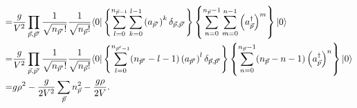 \documentclass{assignment}
\begin{document}
\begin{pf}
\begin{itemize}
{\begin{align}
            \notag=&\frac{g}{V^2}\prod_{\vec{p},\vec{p}'}\frac{1}{\sqrt{n_{\vec{p}'}!}}\frac{1}{\sqrt{n_{\vec{p}}!}}\langle 0\rvert\left\{\sum_{l=0}^{n_{\vec{p}-1}}\sum_{k=0}^{l-1}\left(a_{\vec{p}'}\right)^k\delta_{\vec{p},\vec{p}'}\right\}\left\{\sum_{n=0}^{n_{\vec{p}}-1}\sum_{m=0}^{n-1}\left(a_{\vec{p}}^{\dagger}\right)^m\right\}\lvert 0\rangle\\
            \notag=&\frac{g}{V^2}\prod_{\vec{p},\vec{p}'}\frac{1}{\sqrt{n_{\vec{p}'}!}}\frac{1}{\sqrt{n_{\vec{p}}!}}\langle 0\rvert\left\{\sum_{l=0}^{n_{\vec{p}'-1}}(n_{\vec{p}'}-l-1)\left(a_{\vec{p}'}\right)^l\delta_{\vec{p},\vec{p}'}\right\}\left\{\sum_{n=0}^{n_{\vec{p}}-1}(n_{\vec{p}}-n-1)\left(a_{\vec{p}}^{\dagger}\right)^n\right\}\lvert 0\rangle\\
            =&g\rho^2-\frac{g}{2V^2}\sum_{\vec{p}}n_{\vec{p}}^2-\frac{g\rho}{2V}.
        \end{align}
        }
    \end{itemize}
\end{pf}
\end{document}
